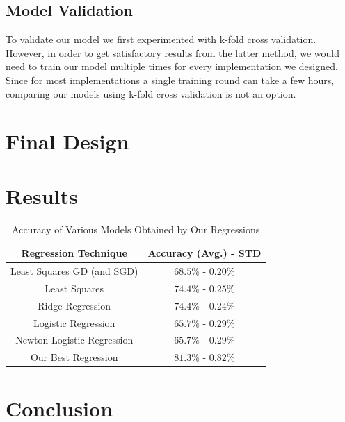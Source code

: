 \documentclass[10pt,conference,compsocconf]{IEEEtran}
\begin{document}
\subsection{Model Validation} 
\label{ssec:model_validation}

To validate our model we first experimented with k-fold cross validation. However, in order to get satisfactory results from the latter method, we would need to train our model multiple times for every implementation we designed. Since for most implementations a single training round can take a few hours, comparing our models using k-fold cross validation is not an option.


\section{Final Design}
\label{sec:final}

\section{Results}
\label{sec:results}

\begin{table}[h]
	\begin{tabular}{ |c|c| } 
		\hline
		\textbf{Regression Technique} & \textbf{Accuracy (Avg.) - STD}  \\
		\hline
		Least Squares GD (and SGD) & $68.5\%$ - $0.20\%$ \\ 
		Least Squares & $74.4\%$ - $0.25\%$ \\ 
		Ridge Regression & $74.4\%$ - $0.24\%$ \\ 
		Logistic Regression & $65.7\%$ - $0.29\%$ \\ 
		Newton Logistic Regression & $65.7\%$ - $0.29\%$ \\ 
		Our Best Regression & $81.3\%$ - $0.82\%$ \\ 
		\hline
	\end{tabular}
	\captionsetup{aboveskip=0.3cm,justification=centering, margin=0.1cm, labelfont=footnotesize, textfont=footnotesize}
	\caption{Accuracy of Various Models Obtained by Our Regressions}
	\label{tab:model_accuracy}
\end{table}

\section{Conclusion}
\label{sec:conclusion}
\end{document}

